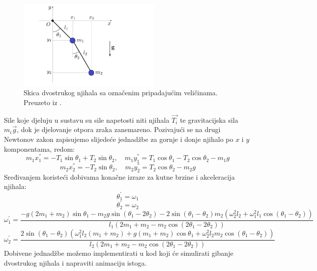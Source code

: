 \documentclass[a4paper,12pt]{article}
\begin{document}
\begin{figure}[h!]
\centering
\includegraphics[width=7cm]{dp_fig1.png}
\caption{Skica dvostrukog njihala sa označenim pripadajućim veličinama. Preuzeto iz \cite{Slika1}. }
\end{figure}

Sile koje djeluju u sustavu su sile napetosti niti njihala $\vec{T_i}$ te gravitacijska sila $m_i\vec{g}$, dok je djelovanje otpora zraka zanemareno. Pozivajući se na drugi Newtonov zakon zapisujemo slijedeće jednadžbe za gornje i donje njihalo po $x$ i $y$ komponentama, redom:
$$m_1 x_1^{''} = -T_1\sin\theta_1+T_2\sin\theta_2,\quad m_1 y_1^{''} = T_1\cos\theta_1-T_2\cos\theta_2-m_1g$$
$$m_2 x_2^{''} = -T_2\sin\theta_2,\quad m_2 y_2^{''} = T_2\cos\theta_2-m_2g$$
Sređivanjem koristeći \cite{Jedn} dobivama konačne izraze za kutne brzine i akceleracija njihala:
$$\theta_1^{'}=\omega_1$$
$$\theta_2^{'}=\omega_2$$
$$\omega_1^{'}=\frac{-g(2m_1+m_2)\sin\theta_1-m_2g\sin(\theta_1-2\theta_2)-2\sin(\theta_1-\theta_2)m_2(\omega_2^{2} l_2+\omega_1^{2} l_1\cos(\theta_1-\theta_2))}{l_1(2m_1+m_2-m_2\cos(2\theta_1-2\theta_2))}$$
$$\omega_2^{'}=\frac{2\sin(\theta_1-\theta_2)(\omega_1^{2}l_2(m_1+m_2)+g(m_1+m_2)\cos\theta_1+\omega_2^{2}l_2m_2\cos(\theta_1-\theta_2))}{l_2(2m_1+m_2-m_2\cos(2\theta_1-2\theta_2))}$$
Dobivene jednadžbe možemo implementirati u kod koji će simulirati gibanje dvostrukog njihala i napraviti animaciju istoga.
\end{document}
